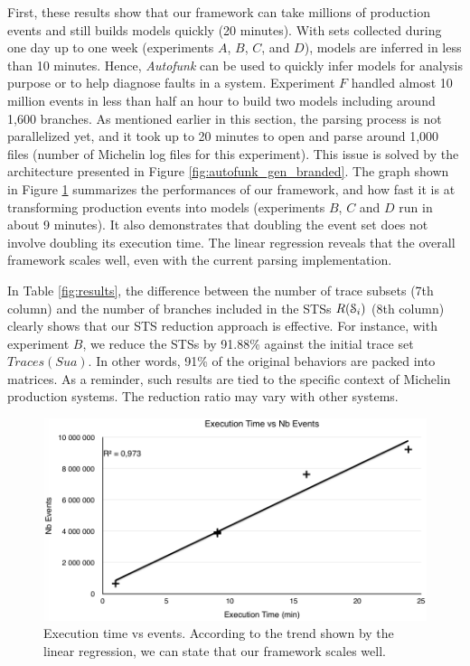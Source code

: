First, these results show that our framework can take millions of
production events and still builds models quickly (20 minutes).
With sets collected during one day up to one week (experiments
$A$, $B$, $C$, and $D$), models are inferred in less than 10
minutes. Hence, \textit{Autofunk} can be used to quickly infer
models for analysis purpose or to help diagnose faults in a
system. Experiment $F$ handled almost 10 million events in less
than half an hour to build two models including around 1,600
branches. As mentioned earlier in this section, the parsing
process is not parallelized yet, and it took up to 20 minutes to
open and parse around 1,000 files (number of Michelin log files
for this experiment). This issue is solved by the architecture
presented in Figure \ref{fig:autofunk_gen_branded}.  The graph
shown in Figure \ref{fig:time-vs-messages} summarizes the
performances of our framework, and how fast it is at transforming
production events into models (experiments $B$, $C$ and $D$ run
in about 9 minutes). It also demonstrates that doubling the event
set does not involve doubling its execution time. The linear
regression reveals that the overall framework scales well, even
with the current parsing implementation.

In Table \ref{fig:results}, the difference between the number of
trace subsets (7th column) and the number of branches included in
the STSs $R(\EuScript{S}_i)$ (8th column) clearly shows that our
STS reduction approach is effective. For instance, with
experiment $B$, we reduce the STSs by 91.88\% against the initial
trace set $Traces(Sua)$. In other words, 91\% of the original
behaviors are packed into matrices. As a reminder, such results
are tied to the specific context of Michelin production systems.
The reduction ratio may vary with other systems.

\begin{figure}[ht]
  \includegraphics[width=1.0\linewidth]{figures/time-vs-messages.png}

  \caption{Execution time vs events. According to the trend shown
  by the linear regression, we can state that our framework
  scales well.}
  \label{fig:time-vs-messages}
\end{figure}

